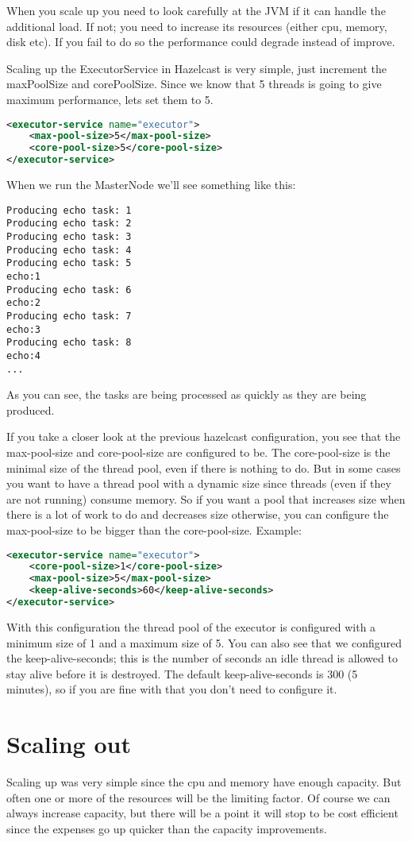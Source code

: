When you scale up you need to look carefully at the JVM if it can handle the additional load. If not; you need to increase its resources (either cpu, memory, disk etc). If you fail to do so the performance could degrade instead of improve. 

Scaling up the ExecutorService in Hazelcast is very simple, just increment the maxPoolSize and corePoolSize. Since we know that 5 threads is going to give maximum performance, lets set them to 5.
\begin{lstlisting}[language=xml]
<executor-service name="executor">
    <max-pool-size>5</max-pool-size>
    <core-pool-size>5</core-pool-size>
</executor-service>
\end{lstlisting}
When we run the MasterNode we'll see something like this:
\begin{lstlisting}
Producing echo task: 1
Producing echo task: 2
Producing echo task: 3
Producing echo task: 4
Producing echo task: 5
echo:1
Producing echo task: 6
echo:2
Producing echo task: 7
echo:3
Producing echo task: 8
echo:4
...
\end{lstlisting}
As you can see, the tasks are being processed as quickly as they are being produced. 

If you take a closer look at the previous hazelcast configuration, you see that the max-pool-size and core-pool-size are configured to be. The core-pool-size is the minimal size of the thread pool, even if there is nothing to do. But in some cases you want to have a thread pool with a dynamic size since threads (even if they are not running) consume memory. So if you want a pool that increases size when there is a lot of work to do and decreases size otherwise, you can configure the max-pool-size to be bigger than the core-pool-size. Example:
\begin{lstlisting}[language=xml]
<executor-service name="executor">
    <core-pool-size>1</core-pool-size> 
    <max-pool-size>5</max-pool-size>
    <keep-alive-seconds>60</keep-alive-seconds>
</executor-service>
\end{lstlisting}
With this configuration the thread pool of the executor is configured with a minimum size of 1 and a maximum size of 5. You can also see that we configured the keep-alive-seconds; this is the number of seconds an idle thread is allowed to stay alive before it is destroyed. The default keep-alive-seconds is 300 (5 minutes), so if you are fine with that you don't need to configure it.

\section{Scaling out}
Scaling up was very simple since the cpu and memory have enough capacity. But often one or more of the resources will be the limiting factor. Of course we can always increase capacity, but there will be a point it will stop to be cost efficient since the expenses go up quicker than the capacity improvements.


